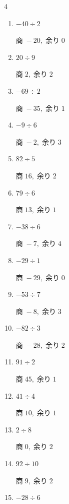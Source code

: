 \begin{multicols}{4}
\begin{enumerate}
        $商\; 1,\; 余り\; 8$

  \item $-40 \div 2$

        $商\; -20,\; 余り\; 0$

  \item $20 \div 9$

        $商\; 2,\; 余り\; 2$

  \item $-69 \div 2$

        $商\; -35,\; 余り\; 1$

  \item $-9 \div 6$

        $商\; -2,\; 余り\; 3$

  \item $82 \div 5$

        $商\; 16,\; 余り\; 2$

  \item $79 \div 6$

        $商\; 13,\; 余り\; 1$

  \item $-38 \div 6$

        $商\; -7,\; 余り\; 4$

  \item $-29 \div 1$

        $商\; -29,\; 余り\; 0$

  \item $-53 \div 7$

        $商\; -8,\; 余り\; 3$

  \item $-82 \div 3$

        $商\; -28,\; 余り\; 2$

  \item $91 \div 2$

        $商\; 45,\; 余り\; 1$

  \item $41 \div 4$

        $商\; 10,\; 余り\; 1$

  \item $2 \div 8$

        $商\; 0,\; 余り\; 2$

\columnbreak %

  \item $92 \div 10$

        $商\; 9,\; 余り\; 2$

  \item $-28 \div 6$


\end{enumerate}
\end{multicols}
